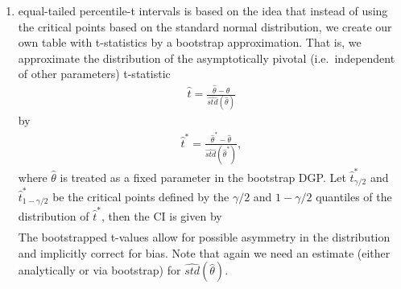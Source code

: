 \begin{enumerate}
\begin{enumerate}
    \item equal-tailed percentile-t intervals is based on the idea that instead of using the critical points based on the standard normal distribution,
      we create our own table with t-statistics by a bootstrap approximation.
    That is, we approximate the distribution of the asymptotically pivotal (i.e.\ independent of other parameters) t-statistic
    \begin{align*}
        \hat{t}=\frac{\hat{\theta}-\theta}{\widehat{std}(\hat{\theta})}
    \end{align*}
    by 
    \begin{align*}
        \hat{t}^\ast = \frac{\hat{\theta}^\ast-\hat{\theta}}{\widehat{std}(\hat{\theta}^\ast)},
    \end{align*}
    where \(\hat{\theta}\) is treated as a fixed parameter in the bootstrap DGP\@.
    Let \(\hat{t}^\ast_{\gamma/2}\) and \(\hat{t}^\ast_{1-\gamma/2}\) be the critical points
      defined by the \(\gamma/2\) and \(1-\gamma/2\) quantiles of the distribution of \(\hat{t}^\ast \),
      then the CI is given by
    \begin{align*}
        [\hat{\theta}-\hat{t}^\ast_{1-\gamma/2} \widehat{std}(\hat{\theta}); \hat{\theta}-\hat{t}^\ast_{\gamma/2} \widehat{std}(\hat{\theta})]
    \end{align*}	
    The bootstrapped t-values allow for possible asymmetry in the distribution and implicitly correct for bias.
    Note that again we need an estimate (either analytically or via bootstrap) for \(\widehat{std}(\hat{\theta})\).
	\end{enumerate}
\end{enumerate}